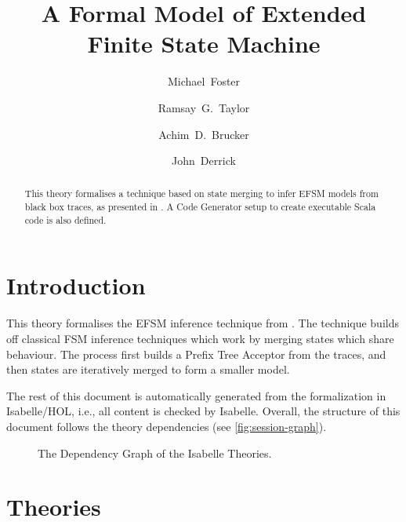\documentclass[10pt,DIV16,a4paper,abstract=true,twoside=semi,openright]{scrreprt}
\title{A Formal Model of Extended Finite State Machine}%
\author{Michael~Foster\orcidID{0000-0001-8233-9873} \and
 Ramsay~G.~Taylor\orcidID{0000-0002-4036-7590} \and
 Achim~D.~Brucker\orcidID{0000-0002-6355-1200} \and
 John~Derrick\orcidID{0000-0002-6631-8914}}
\begin{document}
\maketitle
\begin{abstract}
  This theory formalises a technique based on state merging to infer EFSM models from black box traces, as presented in \cite{foster2019}. A Code Generator setup to create executable Scala code is also defined.

  \begin{quote}
    \bigskip
  \end{quote}
\end{abstract}


\tableofcontents
\cleardoublepage

\chapter{Introduction}
This theory formalises the EFSM inference technique from \cite{foster2019}. The technique builds off classical FSM inference techniques which work by merging states which share behaviour. The process first builds a Prefix Tree Acceptor from the traces, and then states are iteratively merged to form a smaller model.

The rest of this document is automatically generated from the formalization in Isabelle/HOL, i.e., all content is checked by Isabelle.  Overall, the structure of this document follows the theory dependencies (see \autoref{fig:session-graph}).

\begin{sidewaysfigure}
  \centering
  \caption{The Dependency Graph of the Isabelle Theories.\label{fig:session-graph}}
\end{sidewaysfigure}

\nocite{foster.ea:efsm:2018}

\clearpage
\chapter{Theories}




{\small
  
  
}
\end{document}
